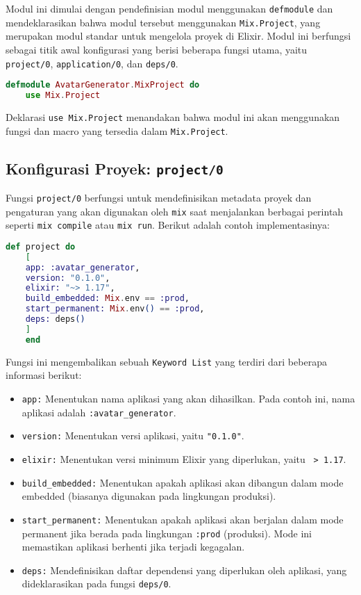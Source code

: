 Modul ini dimulai dengan pendefinisian modul menggunakan \texttt{defmodule} dan mendeklarasikan bahwa modul tersebut menggunakan \texttt{Mix.Project}, yang merupakan modul standar untuk mengelola proyek di Elixir. Modul ini berfungsi sebagai titik awal konfigurasi yang berisi beberapa fungsi utama, yaitu \texttt{project/0}, \texttt{application/0}, dan \texttt{deps/0}.

\begin{lstlisting}[language=elixir]
	defmodule AvatarGenerator.MixProject do
	use Mix.Project
\end{lstlisting}

Deklarasi \texttt{use Mix.Project} menandakan bahwa modul ini akan menggunakan fungsi dan macro yang tersedia dalam \texttt{Mix.Project}.

\subsection{Konfigurasi Proyek: \texttt{project/0}}

Fungsi \texttt{project/0} berfungsi untuk mendefinisikan metadata proyek dan pengaturan yang akan digunakan oleh \texttt{mix} saat menjalankan berbagai perintah seperti \texttt{mix compile} atau \texttt{mix run}. Berikut adalah contoh implementasinya:

\begin{lstlisting}[language=elixir]
	def project do
	[
	app: :avatar_generator,
	version: "0.1.0",
	elixir: "~> 1.17",
	build_embedded: Mix.env == :prod,
	start_permanent: Mix.env() == :prod,
	deps: deps()
	]
	end
\end{lstlisting}

Fungsi ini mengembalikan sebuah \texttt{Keyword List} yang terdiri dari beberapa informasi berikut:

\begin{itemize}
	\item \texttt{app:} Menentukan nama aplikasi yang akan dihasilkan. Pada contoh ini, nama aplikasi adalah \texttt{:avatar\_generator}.
	\item \texttt{version:} Menentukan versi aplikasi, yaitu \texttt{"0.1.0"}.
	\item \texttt{elixir:} Menentukan versi minimum Elixir yang diperlukan, yaitu \texttt{~> 1.17}.
	\item \texttt{build\_embedded:} Menentukan apakah aplikasi akan dibangun dalam mode embedded (biasanya digunakan pada lingkungan produksi).
	\item \texttt{start\_permanent:} Menentukan apakah aplikasi akan berjalan dalam mode permanent jika berada pada lingkungan \texttt{:prod} (produksi). Mode ini memastikan aplikasi berhenti jika terjadi kegagalan.
	\item \texttt{deps:} Mendefinisikan daftar dependensi yang diperlukan oleh aplikasi, yang dideklarasikan pada fungsi \texttt{deps/0}.
\end{itemize}

